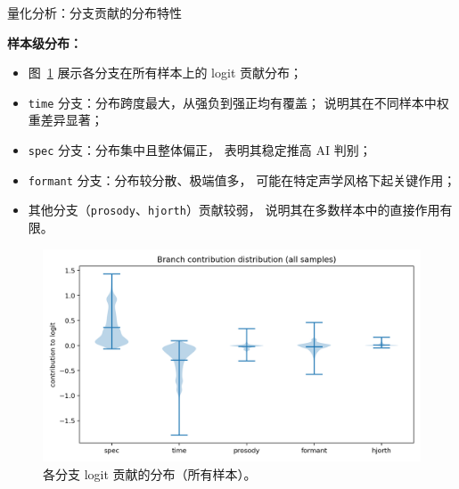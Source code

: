 \documentclass[aspectratio=169]{beamer}
\begin{document}
\begin{frame}{量化分析：分支贡献的分布特性}

\textbf{样本级分布：}
\begin{itemize}
  \item 图~\ref{fig:contrib_violin} 展示各分支在所有样本上的 logit 贡献分布；
  \item \texttt{time} 分支：分布跨度最大，从强负到强正均有覆盖；
        说明其在不同样本中权重差异显著；
  \item \texttt{spec} 分支：分布集中且整体偏正，
        表明其稳定推高 AI 判别；
  \item \texttt{formant} 分支：分布较分散、极端值多，
        可能在特定声学风格下起关键作用；
  \item 其他分支（\texttt{prosody}、\texttt{hjorth}）贡献较弱，
        说明其在多数样本中的直接作用有限。
\end{itemize}

\vspace{0.6em}
\begin{figure}
  \centering
  \includegraphics[width=0.75\linewidth]{images_in_paper/contrib_violin_all.png}
  \caption{各分支 logit 贡献的分布（所有样本）。}
  \label{fig:contrib_violin}
\end{figure}

\end{frame}
\end{document}
